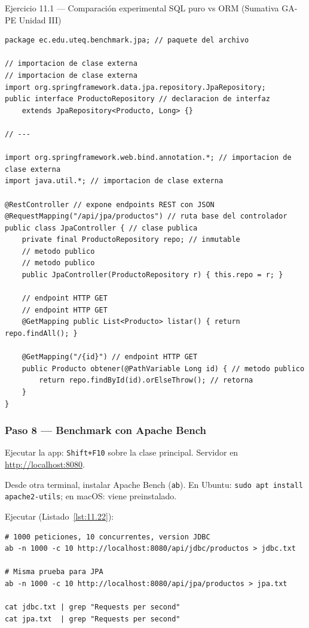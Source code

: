\begin{cajaejercicio}{Ejercicio 11.1 --- Comparación experimental SQL puro vs ORM (Sumativa GA-PE Unidad III)}
\begin{lstlisting}[style=java,caption={ProductoRepository.java + JpaController.java},label=lst:11.21]
package ec.edu.uteq.benchmark.jpa; // paquete del archivo

// importacion de clase externa
// importacion de clase externa
import org.springframework.data.jpa.repository.JpaRepository;
public interface ProductoRepository // declaracion de interfaz
    extends JpaRepository<Producto, Long> {}

// ---

import org.springframework.web.bind.annotation.*; // importacion de clase externa
import java.util.*; // importacion de clase externa

@RestController // expone endpoints REST con JSON
@RequestMapping("/api/jpa/productos") // ruta base del controlador
public class JpaController { // clase publica
    private final ProductoRepository repo; // inmutable
    // metodo publico
    // metodo publico
    public JpaController(ProductoRepository r) { this.repo = r; }

    // endpoint HTTP GET
    // endpoint HTTP GET
    @GetMapping public List<Producto> listar() { return repo.findAll(); }

    @GetMapping("/{id}") // endpoint HTTP GET
    public Producto obtener(@PathVariable Long id) { // metodo publico
        return repo.findById(id).orElseThrow(); // retorna
    }
}
\end{lstlisting}

\subsubsection*{Paso 8 --- Benchmark con Apache Bench}

Ejecutar la app: \texttt{Shift+F10} sobre la clase principal. Servidor
en \url{http://localhost:8080}.

Desde otra terminal, instalar Apache Bench (\texttt{ab}). En Ubuntu:
\texttt{sudo apt install apache2-utils}; en macOS: viene preinstalado.

Ejecutar (Listado~\ref{lst:11.22}):
\begin{lstlisting}[style=shell,numbers=none,caption={Ejemplo de Shell},label=lst:11.22]
# 1000 peticiones, 10 concurrentes, version JDBC
ab -n 1000 -c 10 http://localhost:8080/api/jdbc/productos > jdbc.txt

# Misma prueba para JPA
ab -n 1000 -c 10 http://localhost:8080/api/jpa/productos > jpa.txt

cat jdbc.txt | grep "Requests per second"
cat jpa.txt  | grep "Requests per second"
\end{lstlisting}


\end{cajaejercicio}
